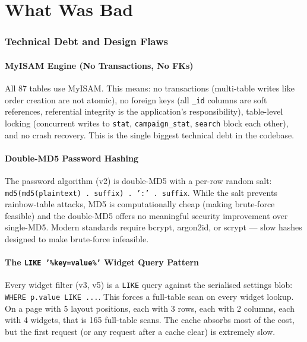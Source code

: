 \documentclass[11pt,a4paper]{article}
\begin{document}
\part{What Was Bad}\label{part:bad}

\section{Technical Debt and Design Flaws}\label{sec:bad}

\subsection{MyISAM Engine (No Transactions, No FKs)}

\begin{badbox}
All 87 tables use MyISAM. This means: no transactions (multi-table
writes like order creation are not atomic), no foreign keys (all
\texttt{\_id} columns are soft references, referential integrity is
the application's responsibility), table-level locking (concurrent
writes to \texttt{stat}, \texttt{campaign\_stat}, \texttt{search}
block each other), and no crash recovery. This is the single
biggest technical debt in the codebase.
\end{badbox}

\subsection{Double-MD5 Password Hashing}

\begin{badbox}
The password algorithm (v2) is double-MD5 with a per-row random salt:
\texttt{md5(md5(plaintext) . suffix) . ':' . suffix}. While the
salt prevents rainbow-table attacks, MD5 is computationally cheap
(making brute-force feasible) and the double-MD5 offers no meaningful
security improvement over single-MD5. Modern standards require
bcrypt, argon2id, or scrypt --- slow hashes designed to make
brute-force infeasible.
\end{badbox}

\subsection{The \texttt{LIKE '\%key=value\%'} Widget Query Pattern}

\begin{badbox}
Every widget filter (v3, v5) is a \texttt{LIKE} query against the
serialised settings blob: \texttt{WHERE p.value LIKE ...}. This forces a full-table scan on every
widget lookup. On a page with 5 layout positions, each with 3 rows,
each with 2 columns, each with 4 widgets, that is 165 full-table
scans. The cache absorbs most of the cost, but the first request (or
any request after a cache clear) is extremely slow.
\end{badbox}
\end{document}
